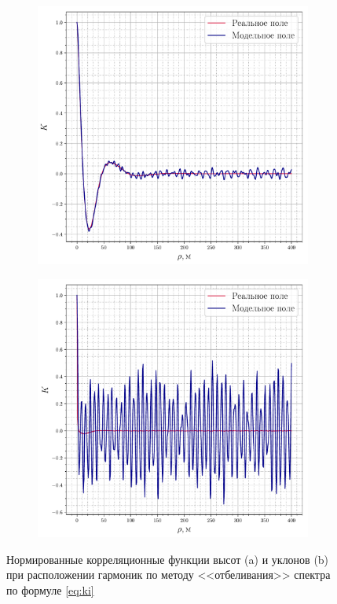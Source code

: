 \begin{figure}[h!]
    \centering
    \begin{subfigure}{0.49\linewidth}
        \centering
        \includegraphics[width=\linewidth]{fig/correlation_height_height2.pdf}
        \caption{}
    \end{subfigure}
    \begin{subfigure}{0.49\linewidth}
        \centering
        \includegraphics[width=\linewidth]{fig/correlation_angles_height2.pdf}
        \caption{}
    \end{subfigure}
    \caption{ Нормированные корреляционные функции высот (a) и уклонов (b) при расположении гармоник
    по методу <<отбеливания>> спектра по формуле \eqref{eq:ki} }
    \label{fig:ki}
\end{figure}

